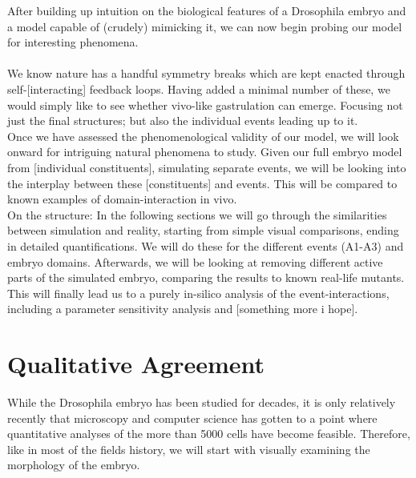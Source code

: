 After building up intuition on the biological features of a Drosophila embryo and a model capable of (crudely) mimicking it, we can now begin probing our model for interesting phenomena.\\
\\
We know nature has a handful symmetry breaks which are kept enacted through self-[interacting] feedback loops. Having added a minimal number of these, we would simply like to see whether vivo-like gastrulation can emerge. Focusing not just the final structures; but also the individual events leading up to it. \\
 
Once we have assessed the phenomenological validity of our model, we will look onward for intriguing natural phenomena to study. Given our full embryo model from [individual constituents], simulating separate events, we will be looking into the interplay between these [constituents] and events. This will be compared to known examples of domain-interaction in vivo.\reph\\


On the structure: In the following sections we will go through the similarities between simulation and reality, starting from simple visual comparisons, ending in detailed quantifications. We will do these for the different events (A1-A3) and embryo domains. Afterwards, we will be looking at removing different active parts of the simulated embryo, comparing the results to known real-life mutants. This will finally lead us to a purely in-silico analysis of the event-interactions, including a parameter sensitivity analysis and [something more i hope].\\ 

\renewcommand{\contentsname}{Results Section Table of Contents}
 \setcounter{tocdepth}{3}
\localtableofcontents
\renewcommand{\contentsname}{Table of Contents}
 \setcounter{tocdepth}{1} 


\newpage

\section{Qualitative Agreement}
While the Drosophila embryo has been studied for decades, it is only relatively recently that microscopy and computer science has gotten to a point where quantitative analyses of the more than 5000 cells have become feasible. Therefore, like in most of the fields history, we will start with visually examining the morphology of the embryo. 


